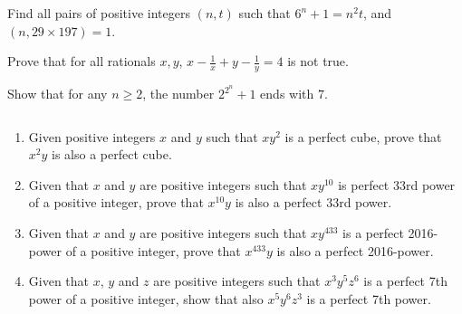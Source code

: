 \documentclass[problems.tex]{subfile}
\begin{document}
	
	
	\begin{problem}
		Find all pairs of positive integers $(n,t)$ such that $6^n+1=n^2t$, and $(n,29 \times 197)=1$. %
	\end{problem}
	
	
	
	
	\begin{problem}
		Prove that for all rationals $x,y$, $x-\frac{1}{x}+y-\frac{1}{y}=4$ is not true. %
	\end{problem}
	
	
	
	\begin{problem}
		Show that for any $n\geq 2$, the number $2^{2^n}+1$ ends with $7$. %
	\end{problem}
	
	
	
	
	\begin{problem}
		$ $
		\begin{enumerate}
			\item Given positive integers $x$ and $y$ such that $xy^2$ is a perfect cube, prove that $x^2y$ is also a perfect cube. %
			\item Given that $x$ and $y$ are positive integers such that $xy^{10}$ is perfect 33rd power of a positive integer, prove that $x^{10}y$ is also a perfect 33rd power. %
			\item Given that $x$ and $y$ are positive integers such that $xy^{433}$ is a perfect 2016-power of a positive integer, prove that $x^{433}y$ is also a perfect 2016-power. %
			\item Given that $x$, $y$ and $z$ are positive integers such that $x^3y^5z^6$ is a perfect 7th power of a positive integer, show that also $x^5y^6z^3$ is a perfect 7th power. %
		\end{enumerate}
	\end{problem}
	
\end{document}
